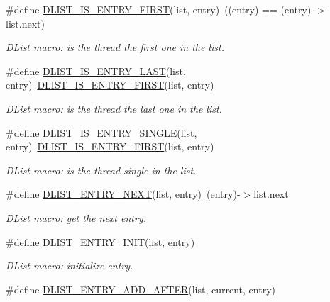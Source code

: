 \begin{DoxyCompactItemize}
\#define \hyperlink{group__kern__impl_ga177fc11d78c08db1f70168bf971e0059}{D\-L\-I\-S\-T\-\_\-\-I\-S\-\_\-\-E\-N\-T\-R\-Y\-\_\-\-F\-I\-R\-S\-T}(list, entry)~((entry) == (entry)-\/$>$list.\-next)
\begin{DoxyCompactList}\small\item\em D\-List macro\-: is the thread the first one in the list. \end{DoxyCompactList}\item 
\#define \hyperlink{group__kern__impl_gaad48325fff9eb7b4c41788e190a28cf2}{D\-L\-I\-S\-T\-\_\-\-I\-S\-\_\-\-E\-N\-T\-R\-Y\-\_\-\-L\-A\-S\-T}(list, entry)~\hyperlink{group__kern__impl_ga177fc11d78c08db1f70168bf971e0059}{D\-L\-I\-S\-T\-\_\-\-I\-S\-\_\-\-E\-N\-T\-R\-Y\-\_\-\-F\-I\-R\-S\-T}(list, entry)
\begin{DoxyCompactList}\small\item\em D\-List macro\-: is the thread the last one in the list. \end{DoxyCompactList}\item 
\#define \hyperlink{group__kern__impl_ga77e64b5c52cb61e2bb7f6a4c6b0c9acc}{D\-L\-I\-S\-T\-\_\-\-I\-S\-\_\-\-E\-N\-T\-R\-Y\-\_\-\-S\-I\-N\-G\-L\-E}(list, entry)~\hyperlink{group__kern__impl_ga177fc11d78c08db1f70168bf971e0059}{D\-L\-I\-S\-T\-\_\-\-I\-S\-\_\-\-E\-N\-T\-R\-Y\-\_\-\-F\-I\-R\-S\-T}(list, entry)
\begin{DoxyCompactList}\small\item\em D\-List macro\-: is the thread single in the list. \end{DoxyCompactList}\item 
\#define \hyperlink{group__kern__impl_gab4b1b58e436cff32fc080493dfa35619}{D\-L\-I\-S\-T\-\_\-\-E\-N\-T\-R\-Y\-\_\-\-N\-E\-X\-T}(list, entry)~(entry)-\/$>$list.\-next
\begin{DoxyCompactList}\small\item\em D\-List macro\-: get the next entry. \end{DoxyCompactList}\item 
\#define \hyperlink{group__kern__impl_ga23a7667839eb576ddc4f55f2fcf77d65}{D\-L\-I\-S\-T\-\_\-\-E\-N\-T\-R\-Y\-\_\-\-I\-N\-I\-T}(list, entry)
\begin{DoxyCompactList}\small\item\em D\-List macro\-: initialize entry. \end{DoxyCompactList}\item 
\#define \hyperlink{group__kern__impl_gaff514b213c2cd3ad388fd5479275834f}{D\-L\-I\-S\-T\-\_\-\-E\-N\-T\-R\-Y\-\_\-\-A\-D\-D\-\_\-\-A\-F\-T\-E\-R}(list, current, entry)

\end{DoxyCompactItemize}
